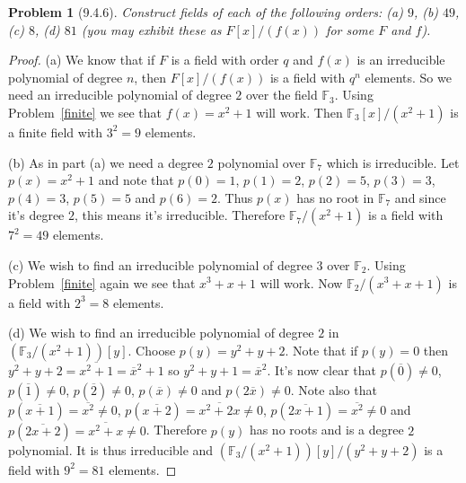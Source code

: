 \documentclass{article}
\newtheorem{problem}{Problem}
\begin{document}
\begin{problem}[9.4.6]
Construct fields of each of the following orders: (a) $9$, (b) $49$, (c) $8$, (d) $81$ (you may exhibit these as $F[x]/(f(x))$ for some $F$ and $f$).
\end{problem}
\begin{proof}
(a) We know that if $F$ is a field with order $q$ and $f(x)$ is an irreducible polynomial of degree $n$, then $F[x]/(f(x))$ is a field with $q^n$ elements. So we need an irreducible polynomial of degree $2$ over the field $\mathbb{F}_3$. Using Problem~\ref{finite} we see that $f(x) = x^2 + 1$ will work. Then $\mathbb{F}_3[x]/(x^2 + 1)$ is a finite field with $3^2 = 9$ elements.

(b) As in part (a) we need a degree $2$ polynomial over $\mathbb{F}_7$ which is irreducible. Let $p(x) = x^2 + 1$ and note that $p(0) = 1$, $p(1) = 2$, $p(2) = 5$, $p(3) = 3$, $p(4) = 3$, $p(5) = 5$ and $p(6) = 2$. Thus $p(x)$ has no root in $\mathbb{F}_7$ and since it's degree $2$, this means it's irreducible. Therefore $\mathbb{F}_7/(x^2 + 1)$ is a field with $7^2 = 49$ elements.

(c) We wish to find an irreducible polynomial of degree $3$ over $\mathbb{F}_2$. Using Problem~\ref{finite} again we see that $x^3 + x + 1$ will work. Now $\mathbb{F}_2/(x^3 + x + 1)$ is a field with $2^3 = 8$ elements.

(d) We wish to find an irreducible polynomial of degree $2$ in $(\mathbb{F}_3/(x^2 + 1))[y]$. Choose $p(y) = y^2 + y + 2$. Note that if $p(y) = 0$ then $y^2 + y + 2 = \overline{x^2 + 1} = \overline{x}^2 + 1$ so $y^2 + y + 1 = \overline{x}^2$. It's now clear that $p(\overline{0}) \neq 0$, $p(\overline{1}) \neq 0$, $p(\overline{2}) \neq 0$, $p(\overline{x}) \neq 0$ and $p(2\overline{x}) \neq 0$. Note also that $p(\overline{x+1}) = \overline{x^2} \neq 0$, $p(\overline{x+2}) = \overline{x^2 + 2x} \neq 0$, $p(\overline{2x+1}) = \overline{x^2} \neq 0$ and $p(\overline{2x+2}) = \overline{x^2 + x} \neq 0$. Therefore $p(y)$ has no roots and is a degree $2$ polynomial. It is thus irreducible and $(\mathbb{F}_3/(x^2 + 1))[y]/(y^2+y+2)$ is a field with $9^2 = 81$ elements.
\end{proof}
\end{document}
